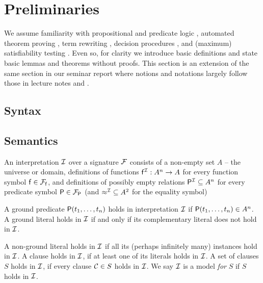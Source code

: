 
\chapter{Preliminaries}



We assume familiarity with propositional and predicate logic \cite{Huth:2004:LCS:975331}, 
automated theorem proving \cite{Fitting:1996:FLA:230183}, 
term rewriting \cite{Baader:1998:TR:280474}, 
decision procedures \cite{Kroening:2008:DPA:1391237}, 
and (maximum) satisfiability testing \cite{Biere:2009:HSV:1550723}.
Even so, for clarity we introduce basic
definitions and state basic lemmas and theorems without proofs.
This section is an extension of the same section in our seminar report \cite{axm:SR2}
where notions and notations largely follow those in lecture notes \cite{AM2015tr} and \cite{GM2013ar}.


\section{Syntax}

















\section{Semantics}

\begin{definition}
	An {\myem interpretation} ${\mathcal I}$ over a signature ${\mathcal F}$ consists of a
	non-empty set $A$ -- the {\myem universe} or {\myem domain},
	definitions of functions ${\mathsf f}^{\mathcal I}: A^n\rightarrow A$ for every function symbol ${\mathsf f}\in{{\mathcal F}_{\mathsf f}}$, 
	and definitions of possibly empty relations 
	 ${{\mathsf P}^{\mathcal I}}\subseteq A^n$ for every predicate symbol ${\mathsf P}\in{{\mathcal F}_{\mathsf P}}$
	 (and ${\approx^{\mathcal I}}\subseteq A^2$ for the equality symbol)
	
	A ground predicate ${\mathsf P}(t_1,\ldots,t_n)$ holds in interpretation ${\mathcal I}$ 
	if ${\mathsf P}(t_1,\ldots,t_n) \in A^n$.
	A ground literal holds in ${\mathcal I}$ if and only if its complementary literal does not hold in ${\mathcal I}$.
	
	A non-ground literal holds in ${\mathcal I}$ if all its 
	(perhaps infinitely many)
	instances hold in ${\mathcal I}$.
	A clause holds in ${\mathcal I}$, if at least one of its literals holds in ${\mathcal I}$.
	A set of clauses $S$ holds in ${\mathcal I}$, if every clause ${\mathcal C}\in S$ holds in ${\mathcal I}$.
	We say ${\mathcal I}$ is a model {\em for} $S$ if $S$ holds in ${\mathcal I}$. 
\end{definition}


